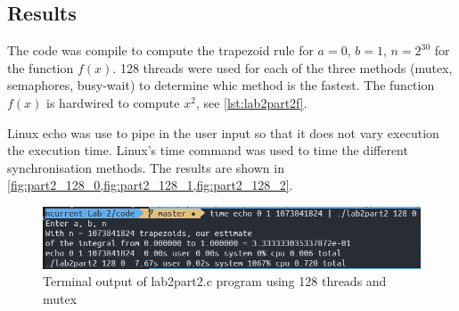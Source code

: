 \vspace{0.5cm}



\subsection{Results}

The code was compile to compute the trapezoid rule for $a=0$, $b=1$, $n=2^{30}$ for the function $f(x)$.
128 threads were used for each of the three methods (mutex, semaphores, busy-wait) to determine whic method is the fastest.
The function $f(x)$ is hardwired to compute $x^2$, see \cref{lst:lab2part2f}.

\vspace{0.5cm}


Linux echo was use to pipe in the user input so that it does not vary execution the execution time. Linux's
time command was used to time the different synchronisation methods. The results are shown in 
\cref{fig:part2_128_0,fig:part2_128_1,fig:part2_128_2}.

\begin{figure}[ht]
	\centering
	\includegraphics[width=\textwidth]{Figures/part2_128_1.PNG}
	\caption{Terminal output of lab2part2.c program using 128 threads and mutex}
	\label{fig:part2_128_0}
\end{figure}

